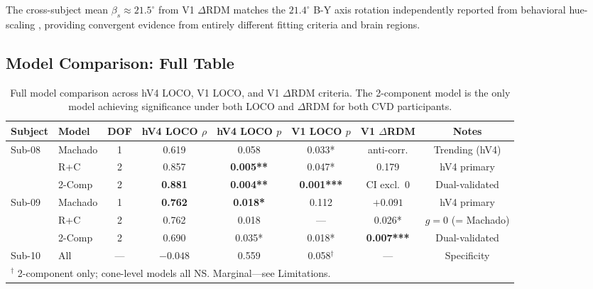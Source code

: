 \documentclass{article}
\begin{document}
The cross-subject mean $\beta_s \approx 21.5^\circ$ from V1 $\Delta$RDM matches the $21.4^\circ$ B-Y axis rotation independently reported from behavioral hue-scaling \cite{placeholder_emery2021}, providing convergent evidence from entirely different fitting criteria and brain regions.

\subsection{Model Comparison: Full Table}

\begin{table}[h]
  \caption{Full model comparison across hV4 LOCO, V1 LOCO, and V1 $\Delta$RDM criteria. The 2-component model is the only model achieving significance under both LOCO and $\Delta$RDM for both CVD participants.}
  \label{tab:full}
  \begin{center}
    \begin{small}
      \begin{tabular}{llcccccc}
        \toprule
        Subject & Model & DOF & hV4 LOCO $\rho$ & hV4 LOCO $p$ & V1 LOCO $p$ & V1 $\Delta$RDM & Notes \\
        \midrule
        \multirow{3}{*}{Sub-08} & Machado & 1 & 0.619 & 0.058 & 0.033* & anti-corr. & Trending (hV4) \\
        & R+C & 2 & 0.857 & \textbf{0.005**} & 0.047* & 0.179 & hV4 primary \\
        & 2-Comp & 2 & \textbf{0.881} & \textbf{0.004**} & \textbf{0.001***} & CI excl.\ 0 & Dual-validated \\
        \midrule
        \multirow{3}{*}{Sub-09} & Machado & 1 & \textbf{0.762} & \textbf{0.018*} & 0.112 & $+0.091$ & hV4 primary \\
        & R+C & 2 & 0.762 & 0.018 & --- & 0.026* & $g{=}0$ (= Machado) \\
        & 2-Comp & 2 & 0.690 & 0.035* & 0.018* & \textbf{0.007***} & Dual-validated \\
        \midrule
        Sub-10 & All & --- & $-0.048$ & 0.559 & 0.058$^\dagger$ & --- & Specificity \\
        \bottomrule
        \multicolumn{8}{l}{\small $^\dagger$ 2-component only; cone-level models all NS. Marginal---see Limitations.} \\
      \end{tabular}
    \end{small}
  \end{center}
\end{table}
\end{document}

